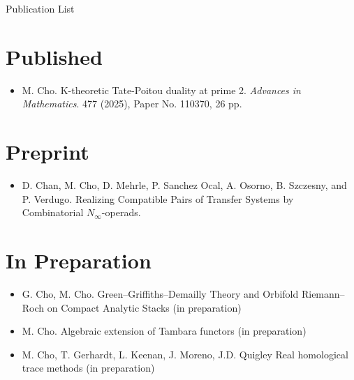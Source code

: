 \documentclass[11pt]{article}
\begin{document}

\begin{center}
\LARGE{Publication List}
\end{center}

\section*{Published}
\begin{itemize}
    \item M. Cho. {K-theoretic Tate-Poitou duality at prime 2}. {\it Advances in Mathematics}. 477 (2025), Paper No. 110370, 26 pp. 
\end{itemize}

\section*{Preprint}
\begin{itemize}
     \item D. Chan, M. Cho, D. Mehrle, P. Sanchez Ocal, A. Osorno, B. Szczesny, and P. Verdugo. Realizing Compatible Pairs of Transfer Systems by Combinatorial $N_\infty$-operads. 
\end{itemize}     

\section*{In Preparation}
\begin{itemize}
    \item G. Cho, M. Cho.  Green–Griffiths–Demailly Theory and Orbifold Riemann–Roch on Compact Analytic Stacks (in preparation)


    \item M. Cho.  Algebraic extension of Tambara functors (in preparation)

    \item M. Cho, T. Gerhardt, L. Keenan, J. Moreno, J.D. Quigley Real homological trace methods (in preparation)
\end{itemize}
\end{document}
